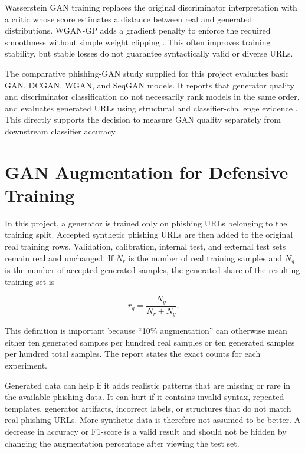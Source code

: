 Wasserstein GAN training replaces the original discriminator interpretation
with a critic whose score estimates a distance between real and generated
distributions. WGAN-GP adds a gradient penalty to enforce the required smoothness
without simple weight clipping \citep{gulrajani2017wgangp}. This often improves
training stability, but stable losses do not guarantee syntactically valid or
diverse URLs.

The comparative phishing-GAN study supplied for this project evaluates basic
GAN, DCGAN, WGAN, and SeqGAN models. It reports that generator quality and
discriminator classification do not necessarily rank models in the same order,
and evaluates generated URLs using structural and classifier-challenge evidence
\citep{pham2023evaluation}. This directly supports the decision to measure GAN
quality separately from downstream classifier accuracy.

\section{GAN Augmentation for Defensive Training}

In this project, a generator is trained only on phishing URLs belonging to the
training split. Accepted synthetic phishing URLs are then added to the original
real training rows. Validation, calibration, internal test, and external test
sets remain real and unchanged. If $N_r$ is the number of real training samples
and $N_g$ is the number of accepted generated samples, the generated share of
the resulting training set is

\begin{equation}
r_g=\frac{N_g}{N_r+N_g}.
\end{equation}

This definition is important because ``10\% augmentation'' can otherwise mean
either ten generated samples per hundred real samples or ten generated samples
per hundred total samples. The report states the exact counts for each
experiment.

Generated data can help if it adds realistic patterns that are missing or rare
in the available phishing data. It can hurt if it contains invalid syntax,
repeated templates, generator artifacts, incorrect labels, or structures that
do not match real phishing URLs. More synthetic data is therefore not assumed
to be better. A decrease in accuracy or F1-score is a valid result and should
not be hidden by changing the augmentation percentage after viewing the test
set.

